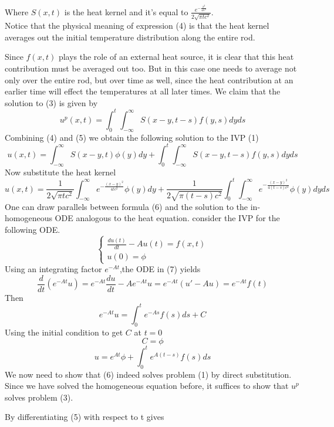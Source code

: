 \documentclass[]{article}
\begin{document}
Where $S(x,t)$ is the heat kernel and it's equal to $\displaystyle \frac{e^{-\frac{x^2}{4tc^2}}}{2\sqrt{\pi tc^2}}$.
\\
Notice that the physical meaning of expression (4) is that the heat
kernel averages out the initial temperature distribution along the entire rod.
\par
Since $f(x, t)$ plays the role of an external heat source, it is clear that this heat contribution must be averaged out too. 
But in this case one needs to average not only over the entire rod, but over time as well, 
since the heat contribution at an earlier time will effect the temperatures at all later times. 
We claim that the solution to (3) is given by
\begin{equation}
    u^p(x,t) = \int_{0}^{t}\int_{-\infty}^{\infty}S(x-y,t-s) f(y,s)dyds
\end{equation}
Combining (4) and (5) we obtain the following solution to the IVP (1)
\begin{equation}
    u(x,t)  = \int_{-\infty}^{\infty}S(x-y,t) \phi(y)dy + \int_{0}^{t}\int_{-\infty}^{\infty}S(x-y,t-s) f(y,s)dyds
\end{equation}
Now substitute the heat kernel
\[
    u(x,t) = \frac{1}{2\sqrt{\pi tc^2}}\int_{-\infty}^{\infty}e^{-\frac{{(x-y)}^2}{4tc^2}} \phi(y)dy + \frac{1}{2\sqrt{\pi (t-s)c^2}} \int_{0}^{t} \int_{-\infty}^{\infty}e^{-\frac{{(x-y)}^2}{4(t-s)c^2}} \phi(y)dyds            
\]
One can draw parallels between formula (6) and the solution to the in-homogeneous ODE analogous
to the heat equation. consider the IVP for the following ODE.
\begin{equation}
    \begin{cases}
        \displaystyle \frac{du(t)}{dt} - A u(t) = f(x,t)
        \\
        u(0) = \phi
    \end{cases}
\end{equation}
Using an integrating factor $e^{-At}$,the ODE in (7) yields
\[
\frac{d}{dt}\left(e^{-At}u\right)= e^{-At} \frac{du}{dt} - Ae^{-At} u  = e^{-At}(u'-Au) = e^{-At} f(t)
\]
Then
\[
    e^{-At}u = \int_{0}^{t} e^{-As} f(s)ds + C
\]
Using the initial condition to get $C$ at $t=0$
\[
C = \phi    
\]
\[
    u = e^{At}\phi + \int_{0}^{t} e^{A(t-s)} f(s)ds
\]
We now need to show that (6) indeed solves problem (1) by direct substitution. 
\\
Since we have solved the homogeneous equation before, it suffices to show that $u^p$ solves problem (3). 
\par
By differentiating (5) with respect to t gives
\end{document}
